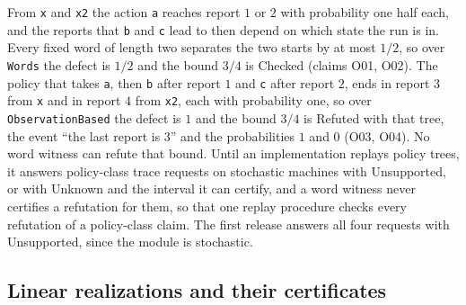 \documentclass[11pt]{article}
\newcommand{\code}[1]{\texttt{#1}}
\theoremstyle{definition}
\theoremstyle{plain}
\begin{document}
From \code{x} and \code{x2} the action \code{a} reaches report $1$ or $2$ with probability one half each,
and the reports that \code{b} and \code{c} lead to then depend on which state the run is in. Every
fixed word of length two separates the two starts by at most $1/2$, so over \code{Words} the defect
is $1/2$ and the bound $3/4$ is Checked (claims O01, O02). The policy that takes \code{a}, then
\code{b} after report $1$ and \code{c} after report $2$, ends in report $3$ from \code{x} and in report
$4$ from \code{x2}, each with probability one, so over \code{ObservationBased} the defect is $1$ and the
bound $3/4$ is Refuted with that tree, the event ``the last report is $3$'' and the probabilities $1$
and $0$ (O03, O04). No word witness can refute that bound. Until an implementation replays policy
trees, it answers policy-class trace requests on stochastic machines with Unsupported, or with
Unknown and the interval it can certify, and a word witness never certifies a refutation for them,
so that one replay procedure checks every refutation of a policy-class claim. The first release
answers all four requests with Unsupported, since the module is stochastic.

\subsection{Linear realizations and their certificates}
\end{document}
